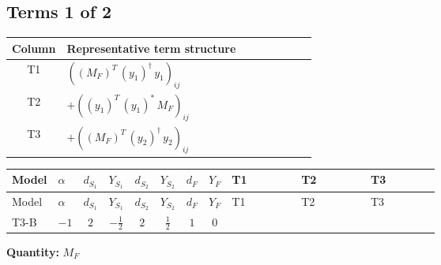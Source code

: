 \documentclass[8pt]{article}
\begin{document}
\begin{landscape}
\subsection*{Terms 1 of 2}
\begin{center}
\begin{tabular}{@{}c >{\raggedright\arraybackslash}p{0.82\linewidth}@{}}
\toprule
Column & Representative term structure \\
\midrule
T1 & \(\displaystyle \left(\left({M_F}\right)^{T}\,\left({y_1}\right)^{\dagger}\,{y_1}\right)_{ij}\) \\
\midrule
T2 & \(\displaystyle +\left(\left({y_1}\right)^{T}\,\left({y_1}\right)^{*}\,{M_F}\right)_{ij}\) \\
\midrule
T3 & \(\displaystyle +\left(\left({M_F}\right)^{T}\,\left({y_2}\right)^{\dagger}\,{y_2}\right)_{ij}\) \\
\midrule
\bottomrule
\end{tabular}
\end{center}
\smallskip
\tiny
\begin{longtable}{@{}llcccccc >{\raggedright\arraybackslash}p{0.21\linewidth} >{\raggedright\arraybackslash}p{0.21\linewidth} >{\raggedright\arraybackslash}p{0.21\linewidth}@{}}
\toprule
Model & $\alpha$ & $d_{S_1}$ & $Y_{S_1}$ & $d_{S_2}$ & $Y_{S_2}$ & $d_F$ & $Y_F$ & T1 & T2 & T3 \\
\midrule
\endfirsthead
\toprule
Model & $\alpha$ & $d_{S_1}$ & $Y_{S_1}$ & $d_{S_2}$ & $Y_{S_2}$ & $d_F$ & $Y_F$ & T1 & T2 & T3 \\
\midrule
\endhead
T3-B & $-1$ & $2$ & $-\frac{1}{2}$ & $2$ & $\frac{1}{2}$ & $1$ & $0$ & \scriptsize\adjustbox{max width=\linewidth}{$\begin{gathered} \left(\left({M_F}\right)^{T}\,\left({y_1}\right)^{\dagger}\,{y_1}\right)_{ij}\end{gathered}$} & \scriptsize\adjustbox{max width=\linewidth}{$\begin{gathered} +\left(\left({y_1}\right)^{T}\,\left({y_1}\right)^{*}\,{M_F}\right)_{ij}\end{gathered}$} & \scriptsize\adjustbox{max width=\linewidth}{$\begin{gathered} +\left(\left({M_F}\right)^{T}\,\left({y_2}\right)^{\dagger}\,{y_2}\right)_{ij}\end{gathered}$} \\
\midrule
\bottomrule
\end{longtable}
\clearpage
\noindent\textbf{Quantity: }$M_F$\par\smallskip

\end{landscape}
\end{document}
